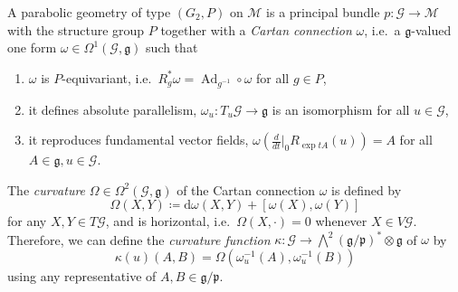 \documentclass{amsart}
\theoremstyle{plain}
\theoremstyle{definition}
\theoremstyle{remark}
\newcommand{\mc}[1]{\mathcal{#1}}
\newcommand{\mfk}[1]{\mathfrak{#1}}
\newcommand{\on}[1]{\operatorname{#1}}
\newcommand{\di}{\mathrm{d}}
\begin{document}
A parabolic geometry of type $(G_2,P)$ on $\mc{M}$ is a principal bundle $p \colon \mc{G} \to \mc{M}$ with the structure group $P$ together with a \emph{Cartan connection} $\omega$, i.e.~a $\mfk{g}$-valued one form $\omega \in \Omega^1(\mc{G},\mfk{g})$ such that
\begin{enumerate}[label=\arabic*)]
    \item $\omega$ is $P$-equivariant, i.e.~$R_g^* \omega = {\on{Ad}_{g^{-1}}} \circ \omega$ for all $g \in P$,
    \item it defines absolute parallelism, $\omega_u \colon T_u\mc{G} \to \mfk{g}$ is an isomorphism for all $u\in \mc{G}$,
    \item it reproduces fundamental vector fields, $\omega\left( \tfrac{d}{dt}\big|_0 R_{\on{exp} tA}(u)\right) = A$ for all $A \in \mfk{g}, u \in \mc{G}$.
\end{enumerate}

The \emph{curvature} $\Omega \in \Omega^2(\mc{G},\mfk{g})$ of the Cartan connection $\omega$ is defined by
\begin{equation} \label{curvature}
    \Omega(X,Y) \coloneqq \di\omega(X,Y) + [\omega(X),\omega(Y)]
\end{equation}
for any $X,Y \in T\mc{G}$, and is horizontal, i.e.~$\Omega(X,\cdot) = 0$ whenever $X \in V\mc{G}$. Therefore, we can define the \emph{curvature function} $\kappa\colon \mc{G} \to \bigwedge^2 (\mfk{g}/\mfk{p})^* \otimes \mfk{g}$ of $\omega$ by
\begin{equation} \label{curvature_function}
    \kappa (u) (A,B) = \Omega\left( \omega_u^{-1}(A),\omega_u^{-1}(B) \right)
\end{equation}
using any representative of $A,B \in \mfk{g}/\mfk{p}$.
\end{document}
